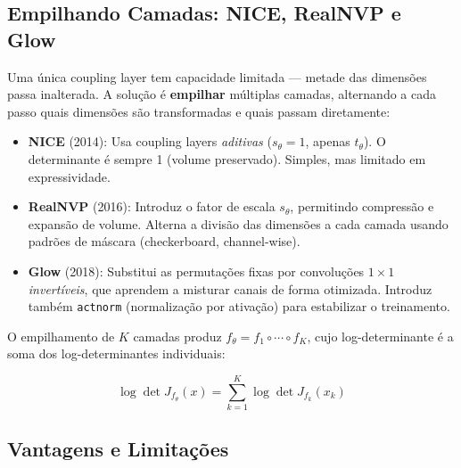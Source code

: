 \documentclass{tufte-handout}
\begin{document}
\subsection{Empilhando Camadas: NICE, RealNVP e Glow}

Uma única coupling layer tem capacidade limitada --- metade das dimensões passa inalterada. A solução é \textbf{empilhar} múltiplas camadas, alternando a cada passo quais dimensões são transformadas e quais passam diretamente:

\begin{itemize}
    \item \textbf{NICE} (2014): Usa coupling layers \textit{aditivas} ($s_\theta = 1$, apenas $t_\theta$). O determinante é sempre 1 (volume preservado). Simples, mas limitado em expressividade.
    \item \textbf{RealNVP} (2016): Introduz o fator de escala $s_\theta$, permitindo compressão e expansão de volume. Alterna a divisão das dimensões a cada camada usando padrões de máscara (checkerboard, channel-wise).
    \item \textbf{Glow} (2018): Substitui as permutações fixas por convoluções $1 \times 1$ \textit{invertíveis}, que aprendem a misturar canais de forma otimizada. Introduz também \texttt{actnorm} (normalização por ativação) para estabilizar o treinamento.
\end{itemize}

O empilhamento de $K$ camadas produz $f_\theta = f_1 \circ \cdots \circ f_K$, cujo log-determinante é a soma dos log-determinantes individuais:

\begin{equation}
\log \det J_{f_\theta}(x) = \sum_{k=1}^K \log \det J_{f_k}(x_k)
\end{equation}

\subsection{Vantagens e Limitações}
\end{document}
